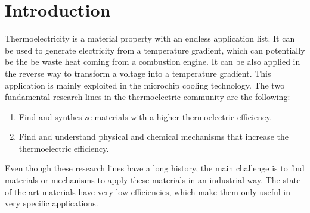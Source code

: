 
\chapter*{Introduction} %

\label{Chapter0} %


Thermoelectricity is a material property with an endless application list. It can be used to generate electricity 
from a temperature gradient\cite{li2009thermoelectric,yang2006thermoelectric}, which can potentially be the be waste heat coming from a combustion engine. It can be 
also applied in the reverse way to transform a voltage into a temperature gradient. This application is mainly 
exploited in the microchip cooling technology\cite{disalvo1999thermoelectric,zhao2014review}. The two fundamental 
research lines in the thermoelectric community are the following: 
\begin{enumerate}
\item Find and synthesize materials with a higher thermoelectric efficiency.
\item Find and understand physical and chemical mechanisms that increase the thermoelectric efficiency. 
\end{enumerate}	
Even though these research lines have a long history, the main challenge is to find materials or mechanisms to apply 
these materials in an industrial way. The state of the art materials have very low efficiencies, which make them 
only useful in very specific applications. \\

